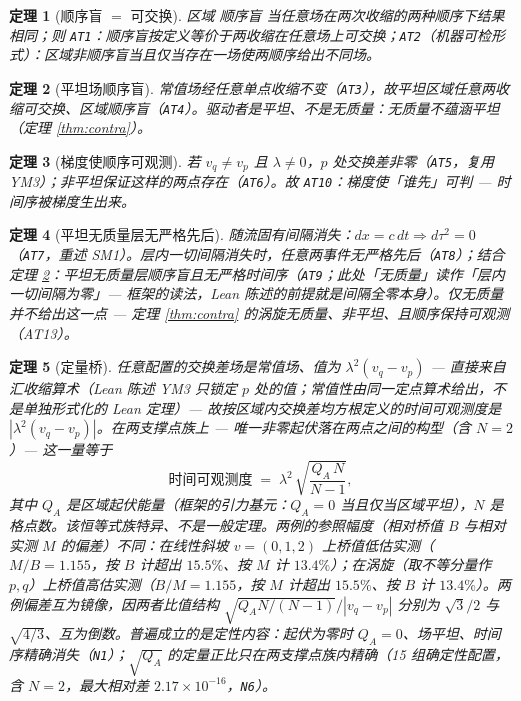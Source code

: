 \documentclass[aps,prd,preprint,superscriptaddress,amsmath,amssymb]{revtex4-2}
\newtheorem{theorem}{定理}[section]
\begin{document}
\begin{theorem}[顺序盲 $=$ 可交换]
\label{thm:orderblind}
区域 \emph{顺序盲} 当任意场在两次收缩的两种顺序下结果相同；则 \texttt{AT1}：顺序盲按定义等价于两收缩在任意场上可交换；\texttt{AT2}（机器可检形式）：区域非顺序盲当且仅当存在一场使两顺序给出不同场。
\end{theorem}

\begin{theorem}[平坦场顺序盲]
\label{thm:flat}
常值场经任意单点收缩不变（\texttt{AT3}），故平坦区域任意两收缩可交换、区域顺序盲（\texttt{AT4}）。驱动者是平坦、不是无质量：无质量不蕴涵平坦（定理 \ref{thm:contra}）。
\end{theorem}

\begin{theorem}[梯度使顺序可观测]
\label{thm:gradient}
若 $v_q\ne v_p$ 且 $\lambda\ne0$，$p$ 处交换差非零（\texttt{AT5}，复用 YM3）；非平坦保证这样的两点存在（\texttt{AT6}）。故 \texttt{AT10}：\emph{梯度使「谁先」可判 --- 时间序被梯度生出来。}
\end{theorem}

\begin{theorem}[平坦无质量层无严格先后]
\label{thm:massless}
随流固有间隔消失：$dx=c\,dt \Rightarrow d\tau^2=0$（\texttt{AT7}，重述 SM1）。层内一切间隔消失时，任意两事件无严格先后（\texttt{AT8}）；结合定理 \ref{thm:flat}：平坦无质量层顺序盲且无严格时间序（\texttt{AT9}；此处「无质量」读作「层内一切间隔为零」--- 框架的读法，Lean 陈述的前提就是间隔全零本身）。仅无质量并不给出这一点 --- 定理 \ref{thm:contra} 的涡旋无质量、非平坦、且顺序保持可观测（AT13）。
\end{theorem}

\begin{theorem}[定量桥]
\label{thm:bridge}
任意配置的交换差场是常值场、值为 $\lambda^2(v_q-v_p)$ --- 直接来自汇收缩算术（Lean 陈述 YM3 只锁定 $p$ 处的值；常值性由同一定点算术给出，不是单独形式化的 Lean 定理）--- 故按区域内交换差均方根定义的时间可观测度是 $|\lambda^2(v_q-v_p)|$。在两支撑点族上 --- 唯一非零起伏落在两点之间的构型（含 $N=2$）--- 这一量等于
\begin{equation}
\text{时间可观测度}
\;=\; \lambda^2\,\sqrt{\frac{Q_A\,N}{N-1}},
\label{eq:timeobs}
\end{equation}
其中 $Q_A$ 是区域起伏能量（框架的引力基元：$Q_A=0$ 当且仅当区域平坦），$N$ 是格点数。该恒等式族特异、不是一般定理。两例的参照幅度（相对桥值 $B$ 与相对实测 $M$ 的偏差）不同：在线性斜坡 $v=(0,1,2)$ 上桥值\emph{低估}实测（$M/B=1.155$，按 $B$ 计超出 $15.5\%$、按 $M$ 计 $13.4\%$）；在涡旋（取不等分量作 $p,q$）上桥值\emph{高估}实测（$B/M=1.155$，按 $M$ 计超出 $15.5\%$、按 $B$ 计 $13.4\%$）。两例偏差互为镜像，因两者比值结构 $\sqrt{Q_A N/(N-1)}/|v_q-v_p|$ 分别为 $\sqrt3/2$ 与 $\sqrt{4/3}$、互为倒数。普遍成立的是定性内容：起伏为零时 $Q_A=0$、场平坦、时间序精确消失（\texttt{N1}）；$\sqrt{Q_A}$ 的定量正比只在两支撑点族内精确（15 组确定性配置，含 $N=2$，最大相对差 $2.17\times10^{-16}$，\texttt{N6}）。
\end{theorem}
\end{document}
